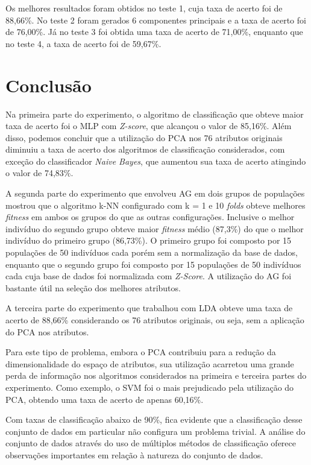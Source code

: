 \documentclass[conference]{IEEEtran}
\begin{document}
Os melhores resultados foram obtidos no teste 1, cuja taxa de acerto foi de 88,66\%. No teste 2 foram gerados 6 componentes principais e a taxa de acerto foi de 76,00\%. Já no teste 3 foi obtida uma taxa de acerto de 71,00\%, enquanto que no teste 4, a taxa de acerto foi de 59,67\%.

\section{Conclusão}
Na primeira parte do experimento, o algoritmo de classificação que obteve maior taxa de acerto foi o MLP com {\it Z-score}, que alcançou o valor de 85,16\%. Além disso, podemos concluir que a utilização do PCA nos 76 atributos originais diminuiu a taxa de acerto dos algoritmos de classificação considerados, com exceção do classificador {\it Naive Bayes}, que aumentou sua taxa de acerto atingindo o valor de 74,83\%.

A segunda parte do experimento que envolveu AG em dois grupos de populações mostrou que o algoritmo k-NN configurado com k = 1 e 10 {\it folds} obteve melhores {\it fitness} em ambos os grupos do que as outras configurações. Inclusive o melhor indivíduo do segundo grupo obteve maior {\it fitness} médio (87,3\%) do que o melhor indivíduo do primeiro grupo (86,73\%). O primeiro grupo foi composto por 15 populações de 50 indivíduos cada porém sem a normalização da base de dados, enquanto que o segundo grupo foi composto por 15 populações de 50 indivíduos cada cuja base de dados foi normalizada com {\it Z-Score}. A utilização do AG foi bastante útil na seleção dos melhores atributos.

A terceira parte do experimento que trabalhou com LDA obteve uma taxa de acerto de 88,66\% considerando os 76 atributos originais, ou seja, sem a aplicação do PCA nos atributos. 

Para este tipo de problema, embora o PCA contribuiu para a redução da dimensionalidade do espaço de atributos, sua utilização acarretou uma grande perda de informação nos algoritmos considerados na primeira e terceira partes do experimento. Como exemplo, o SVM foi o mais prejudicado pela utilização do PCA, obtendo uma taxa de acerto de apenas 60,16\%.

Com taxas de classificação abaixo de 90\%, fica evidente que a classificação desse conjunto de dados em particular não configura um problema trivial. A análise do conjunto de dados através do uso de múltiplos métodos de classificação oferece observações importantes em relação à natureza do conjunto de dados.
\end{document}
